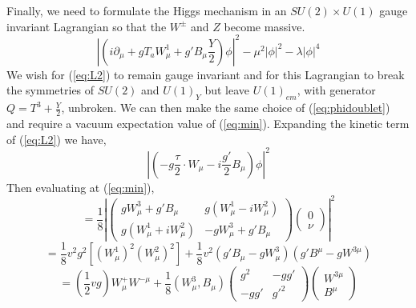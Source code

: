 Finally, we need to formulate the Higgs mechanism in an $SU(2)\times U(1)$ 
gauge invariant Lagrangian so that the $W^{\pm}$ and $Z$ become massive. 
\begin{equation} %
\left| \left( i\partial_{\mu}+gT_{a}W_{\mu}^{1}+g'B_{\mu}\frac{Y}{2}\right)\phi \right|^{2} - \mu^{2}\left| \phi \right| ^{2}
-\lambda\left| \phi \right| ^{4}
\label{eq:L2}
\end{equation}
We wish for (\ref{eq:L2}) to remain gauge invariant and 
for this Lagrangian to break the symmetries of $SU(2)$ and $U(1)_{Y}$
but leave $U(1)_{em}$, with generator $Q=T^{3}+\frac{Y}{2}$, unbroken. 
We can then make the same choice of (\ref{eq:phidoublet}) and require a vacuum 
expectation value of (\ref{eq:min}).
Expanding the kinetic term of (\ref{eq:L2}) we have,
\begin{equation}
\left| \left(-g\frac{\tau}{2}\cdot W_{\mu}-i\frac{g'}{2}B_{\mu}\right)\phi\right|^{2}
\end{equation}
Then evaluating at (\ref{eq:min}),
\begin{equation}
=\frac{1}{8}\left|
\begin{pmatrix}
		gW_{\mu}^{3}+g'B_{\mu} & g(W_{\mu}^{1}-iW_{\mu}^{2})\\
		g(W_{\mu}^{1}+iW_{\mu}^{2}) & -gW_{\mu}^{3}+g'B_{\mu}
\end{pmatrix}
\begin{pmatrix}
0\\
\nu
\end{pmatrix}
\right|^{2}
\end{equation}
\begin{equation}
=
\frac{1}{8}v^{2}g^{2}\left[\left(W_{\mu}^{1} \right)^{2} \left(W_{\mu}^{2} \right)^{2} \right]
+\frac{1}{8}v^{2}(g'B_{\mu}-gW_{\mu}^{3})(g'B^{\mu}-gW^{3\mu}) 
\end{equation}
\begin{equation}
=(\frac{1}{2}v g)W_{\mu}^{+}W^{-\mu}+\frac{1}{8}(W_{\mu}^{3},B_{\mu})
\begin{pmatrix}
g^{2} & -gg'\\
-gg'  & g'^{2}
\end{pmatrix}
\begin{pmatrix}
W^{3\mu}\\
B^{\mu}
\end{pmatrix}
\label{eq:finalH}
\end{equation}
